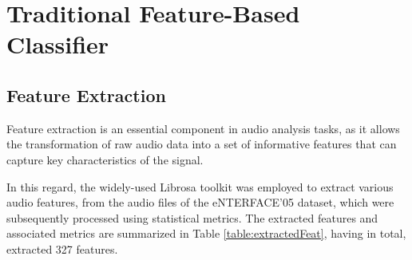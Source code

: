\section{Traditional Feature-Based Classifier}


\subsection{Feature Extraction}

Feature extraction is an essential component in audio analysis tasks, as it allows the transformation of raw audio data into a set of informative features that can capture key characteristics of the signal.

In this regard, the widely-used Librosa toolkit was employed to extract various audio features, from the audio files of the eNTERFACE'05 dataset, which were subsequently processed using statistical metrics. The extracted features and associated metrics are summarized in Table \ref{table:extractedFeat}, having in total, extracted 327 features.

